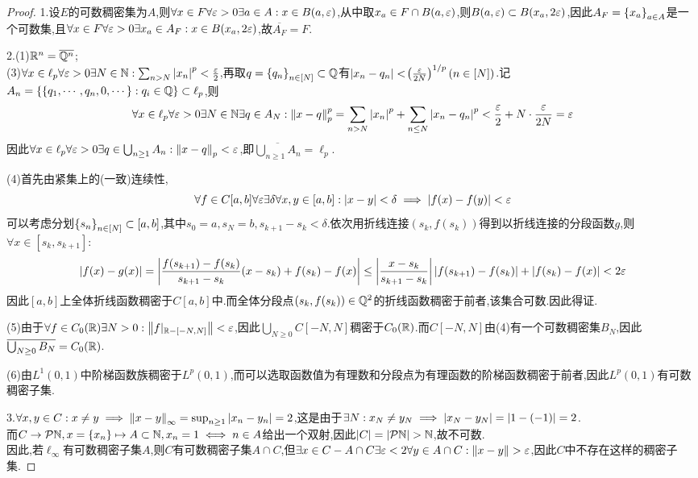 \documentclass[UTF8]{article}
\begin{document}
\begin{proof}
    1.设$E$的可数稠密集为$A$,则$\forall x\in F\forall \varepsilon>0\exists a\in A:x\in B(a,\varepsilon)$,从中取$x_a\in F\cap B(a,\varepsilon)$,则$B(a,\varepsilon)\subset B(x_a,2\varepsilon)$,因此$A_F=\left\{x_a\right\}_{a\in A}$是一个可数集,且$\forall x\in F\forall\varepsilon>0\exists x_a\in A_F:x\in B(x_a,2\varepsilon)$,故$\overline{A_F}=F$.

    2.(1)$\mathbb{R}^n=\overline{\mathbb{Q}^n}$;\\

    (3)$\forall x\in \ell_p\forall \varepsilon>0\exists N\in \mathbb{N}:\sum_{n>N}\left|x_n\right|^p<\frac{\varepsilon}{2}$,再取$q=\left\{q_n\right\}_{n\in [N]}\subset \mathbb{Q}$有$\left|x_n-q_n\right|<\!\left(\frac{\varepsilon}{2N}\right)^{1/p}(n\in [N])$.记$A_n=\left\{\left\{q_1,\cdots,q_n,0,\cdots\right\}:q_i\in \mathbb{Q}\right\}\subset \ell_p$,则$$\forall x\in \ell_p\forall \varepsilon>0\exists N\in \mathbb{N}\exists q\in A_N:\left\|x-q\right\|_p^{p}=\sum_{n>N}\left|x_n\right|^p+\sum_{n\leq N}\left|x_n-q_n\right|^p<\frac{\varepsilon}{2}+N\cdot\frac{\varepsilon}{2N}=\varepsilon$$
    因此$\forall x\in \ell_p\forall \varepsilon>0\exists q\in \bigcup_{n\geq 1}A_n:\left\|x-q\right\|_p<\varepsilon$,即$\overline{\bigcup_{n\geq 1}A_n}=\ell_p$.

    (4)首先由紧集上的(一致)连续性,$$\forall f\in C[a,b]\forall \varepsilon\exists \delta\forall x,y\in [a,b]:\left|x-y\right|<\delta\implies \left|f(x)-f(y)\right|<\varepsilon$$
    可以考虑分划$\left\{s_n\right\}_{n\in [N]}\subset [a,b]$,其中$s_0=a,s_N=b,s_{k+1}-s_k<\delta$.依次用折线连接$(s_k,f(s_k))$得到以折线连接的分段函数$g$,则$\forall x\in [s_k,s_{k+1}]:$ $$\left|f(x)-g(x)\right|=\left|
        \frac{f(s_{k+1})-f(s_k)}{s_{k+1}-s_k}(x-s_k)+f(s_k)-f(x)\right|\leq \left|\frac{x-s_k}{s_{k+1}-s_k}\right|\left|f(s_{k+1})-f(s_k)\right|+\left|f(s_k)-f(x)\right|<2\varepsilon$$
    因此$[a,b]$上全体折线函数稠密于$C[a,b]$中.而全体分段点$(s_k,f(s_k))\in \mathbb{Q}^2$的折线函数稠密于前者,该集合可数.因此得证.

    (5)由于$\forall f\in C_0(\mathbb{R})\exists N>0:\left\|f|_{\mathbb{R}-[-N,N]}\right\|<\varepsilon$,因此$\bigcup_{N\geq 0}C[-N,N]$稠密于$C_0(\mathbb{R})$.而$C[-N,N]$由(4)有一个可数稠密集$B_N$,因此$\overline{\bigcup_{N\geq 0}B_N}=C_0(\mathbb{R})$.

    (6)由$L^1(0,1)$中阶梯函数族稠密于$L^p(0,1)$,而可以选取函数值为有理数和分段点为有理函数的阶梯函数稠密于前者,因此$L^p(0,1)$有可数稠密子集.

    3.$\forall x,y\in C:x\neq y\implies \left\|x-y\right\|_\infty=\sup_{n\geq 1}\left|x_n-y_n\right|=2$,这是由于$\exists N:x_N\neq y_N\implies \left|x_N-y_N\right|=\left|1-(-1)\right|=2$.\\
    而$C\to\mathcal{P}{\mathbb{N}}, x=\left\{x_n\right\}\mapsto A\subset \mathbb{N},x_n=1\iff n\in A$给出一个双射,因此$\abs{C}=\abs{\mathcal{P}{\N}}>\N$,故不可数.\\
    因此,若$\ell_\infty$有可数稠密子集$A$,则$C$有可数稠密子集$A\cap C$,但$\exists x\in C-A\cap C\exists \ve<2\forall y\in A\cap C:\norm{x-y}>\ve$,因此$C$中不存在这样的稠密子集.
\end{proof}
\end{document}
